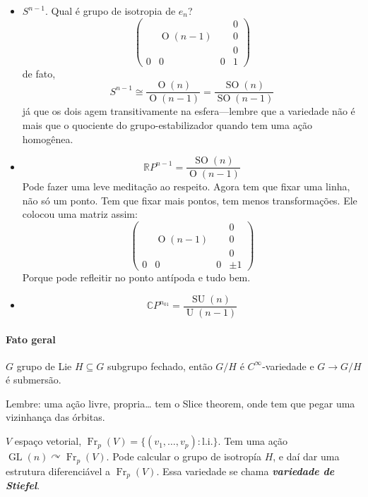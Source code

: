 \begin{example}\leavevmode
	\begin{itemize}
		\item $S^{n-1}$. Qual é grupo de isotropia de $e_n$?
			\[\begin{pmatrix} &&& 0\\
			& \operatorname{O}(n-1)&&0\\
			&&&0\\
			0&0&0&1\end{pmatrix} \]
		de fato,
		\[S ^{n-1}\cong \dfrac{\operatorname{O}(n)}{\operatorname{O}(n-1)}=\dfrac{\operatorname{SO}(n)}{\operatorname{SO}(n-1)}\]
		já que os dois agem transitivamente na esfera---lembre que a variedade não é mais que o quociente do grupo-estabilizador quando tem uma ação homogênea.

\item \[\mathbb{R}P^{n-1}=\dfrac{\operatorname{SO}(n)}{\operatorname{O}(n-1)}\]
	Pode fazer uma leve meditação ao respeito. Agora tem que fixar uma linha, não só um ponto. Tem que fixar mais pontos, tem menos transformações. Ele colocou uma matriz assim:
				\[\begin{pmatrix} &&& 0\\
			& \operatorname{O}(n-1)&&0\\
			&&&0\\
			0&0&0&\pm 1\end{pmatrix} \]
Porque pode refleitir no ponto antípoda e tudo bem.
	\item \[\mathbb{C}P^{n_01}=\dfrac{\operatorname{SU}(n)}{\operatorname{U}(n-1)}\]
	\end{itemize}
\end{example}

\paragraph{Fato geral}  $G$ grupo de Lie $H\subseteq G$ subgrupo fechado, então $G/H$  é $C^\infty$-variedade e $G\to G/H$ é submersão.

Lembre: uma ação livre, propria… tem o Slice theorem, onde tem que pegar uma vizinhança das órbitas.

\begin{example}[Curiosidade]
	$V$ espaço vetorial, $\operatorname{Fr}_p(V)=\{(v_1,\ldots,v_p):\text{l.i.} \}$. Tem uma ação $\operatorname{GL}(n)\curvearrowright \operatorname{Fr}_p(V)$. Pode calcular o grupo de isotropía $H$, e daí dar uma estrutura diferenciável a $\operatorname{Fr}_p(V)$. Essa variedade se chama \textit{\textbf{variedade de Stiefel}}.
\end{example}

